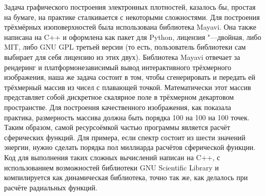 Задача графического построения электронных плотностей, казалось бы, простая на бумаге, на практике сталкивается с
некоторыми сложностями. Для построения трёхмёрных изоповерхностей была использована библиотека
Mayavi\cite{ramachandran2011mayavi}. Она также написана на C++ и оформлена как пакет для Python, лицензия "---двойная,
либо MIT, либо GNU GPL третьей версии (то есть, пользователь библиотеки сам выбирает для себя лицензию из этих двух).
Библиотека Mayavi отвечает за рендеринг и платформонезависимый вывод интерактивного трёхмерного изображения, наша же
задача состоит в том, чтобы сгенерировать и передать ей трёхмерный массив из чисел с плавающей точкой. Математически
этот массив представляет собой дискретное скалярное поле в трёхмерном декартовом пространстве. Для построения
качественного изображения, как показала практика, размерность массива должна быть порядка 100 на 100 на 100 точек.
Таким образом, самой ресурсоёмкой частью программы является расчёт сферических функций. Для примера, если спектр состоит
из шести значений энергии, нужно сделать порядка пол миллиарда расчётов сферической функции. Код для выполнения
таких сложных вычислений написан на C++, с использованием возможностей библиотеки GNU Scientific Library и компилируется
как динамическая библиотека, точно так же, как делалось при расчёте радиальных функций.

